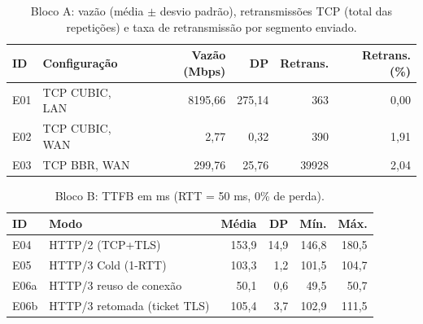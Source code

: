 \begin{table}[t]\centering\small
\caption{Bloco A: vazão (média $\pm$ desvio padrão), retransmissões TCP (total das repetições) e taxa de retransmissão por segmento enviado.}\label{tab:blocoA}
\begin{tabular}{llrrrr}\toprule
ID & Configuração & Vazão (Mbps) & DP & Retrans. & Retrans. (\%) \\ \midrule
E01 & TCP CUBIC, LAN & 8195,66 & 275,14 & 363 & 0,00 \\
E02 & TCP CUBIC, WAN & 2,77 & 0,32 & 390 & 1,91 \\
E03 & TCP BBR, WAN & 299,76 & 25,76 & 39928 & 2,04 \\
\bottomrule\end{tabular}
\end{table}

\begin{table}[t]\centering\small
\caption{Bloco B: TTFB em ms (RTT = 50 ms, 0\% de perda).}\label{tab:blocoB}
\begin{tabular}{llrrrr}\toprule
ID & Modo & Média & DP & Mín. & Máx. \\ \midrule
E04 & HTTP/2 (TCP+TLS) & 153,9 & 14,9 & 146,8 & 180,5 \\
E05 & HTTP/3 Cold (1-RTT) & 103,3 & 1,2 & 101,5 & 104,7 \\
E06a & HTTP/3 reuso de conexão & 50,1 & 0,6 & 49,5 & 50,7 \\
E06b & HTTP/3 retomada (ticket TLS) & 105,4 & 3,7 & 102,9 & 111,5 \\
\bottomrule\end{tabular}
\end{table}
